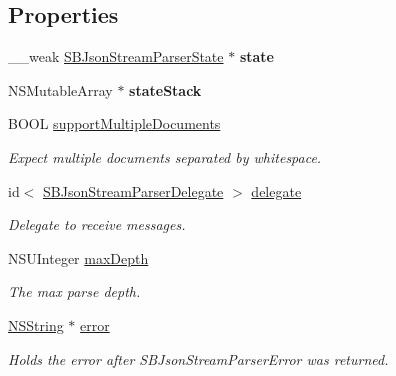 \subsection*{\-Properties}
\begin{DoxyCompactItemize}
\item 
\hypertarget{interface_s_b_json_stream_parser_a45c62ac237203d2a369ca8b33421a5d3}{
\-\_\-\-\_\-weak \hyperlink{interface_s_b_json_stream_parser_state}{\-S\-B\-Json\-Stream\-Parser\-State} $\ast$ {\bfseries state}}
\label{interface_s_b_json_stream_parser_a45c62ac237203d2a369ca8b33421a5d3}

\item 
\hypertarget{interface_s_b_json_stream_parser_adc7f94b3178864022a38ccdee6f7475c}{
\-N\-S\-Mutable\-Array $\ast$ {\bfseries state\-Stack}}
\label{interface_s_b_json_stream_parser_adc7f94b3178864022a38ccdee6f7475c}

\item 
\-B\-O\-O\-L \hyperlink{interface_s_b_json_stream_parser_afd976c605b67edbb8b7abbebcc5b4093}{support\-Multiple\-Documents}
\begin{DoxyCompactList}\small\item\em \-Expect multiple documents separated by whitespace. \end{DoxyCompactList}\item 
id$<$ \hyperlink{protocol_s_b_json_stream_parser_delegate-p}{\-S\-B\-Json\-Stream\-Parser\-Delegate} $>$ \hyperlink{interface_s_b_json_stream_parser_ae07425e91e0329ab3a1adeacf3122051}{delegate}
\begin{DoxyCompactList}\small\item\em \-Delegate to receive messages. \end{DoxyCompactList}\item 
\-N\-S\-U\-Integer \hyperlink{interface_s_b_json_stream_parser_a1c6f49cb5dd676452994d96498bb5a3f}{max\-Depth}
\begin{DoxyCompactList}\small\item\em \-The max parse depth. \end{DoxyCompactList}\item 
\hypertarget{interface_s_b_json_stream_parser_a2345c486bc9f4de7bcd69eb7f6286f3b}{
\hyperlink{class_n_s_string}{\-N\-S\-String} $\ast$ \hyperlink{interface_s_b_json_stream_parser_a2345c486bc9f4de7bcd69eb7f6286f3b}{error}}
\label{interface_s_b_json_stream_parser_a2345c486bc9f4de7bcd69eb7f6286f3b}

\begin{DoxyCompactList}\small\item\em \-Holds the error after \-S\-B\-Json\-Stream\-Parser\-Error was returned. \end{DoxyCompactList}\end{DoxyCompactItemize}


